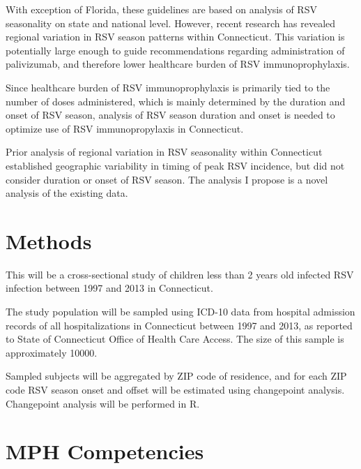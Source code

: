 \documentclass{article}
\renewcommand{\cite}[1]{\autocite{#1}}
\begin{document}
With exception of Florida, these guidelines are based on analysis of RSV seasonality on state and national level. \cite{AmericanAcademyofPediatricsCommitteeonInfectiousDiseasesandCommitteeonFetusandNewborn:2003ug} However, recent research has revealed regional variation in RSV season patterns within Connecticut. \cite{Noveroske:y4fi3188} This variation is potentially large enough to guide recommendations regarding administration of palivizumab, and therefore lower healthcare burden of RSV immunoprophylaxis.

Since healthcare burden of RSV immunoprophylaxis is primarily tied to the number of doses administered, which is mainly determined by the duration and onset of RSV season, analysis of RSV season duration and onset is needed to optimize use of RSV immunopropylaxis in Connecticut.

Prior analysis of regional variation in RSV seasonality within Connecticut established geographic variability in timing of peak RSV incidence, but did not consider duration or onset of RSV season. \cite{Noveroske:y4fi3188} The analysis I propose is a novel analysis of the existing data.

\section{Methods}

This will be a cross-sectional study of children less than 2 years old infected RSV infection between 1997 and 2013 in Connecticut.

The study population will be sampled using ICD-10 data from hospital admission records of all hospitalizations in Connecticut between 1997 and 2013, as reported to State of Connecticut Office of Health Care Access. The size of this sample is approximately 10000.

Sampled subjects will be aggregated by ZIP code of residence, and for each ZIP code RSV season onset and offset will be estimated using changepoint analysis. Changepoint analysis will be performed in R. 

\section{MPH Competencies}
\end{document}
